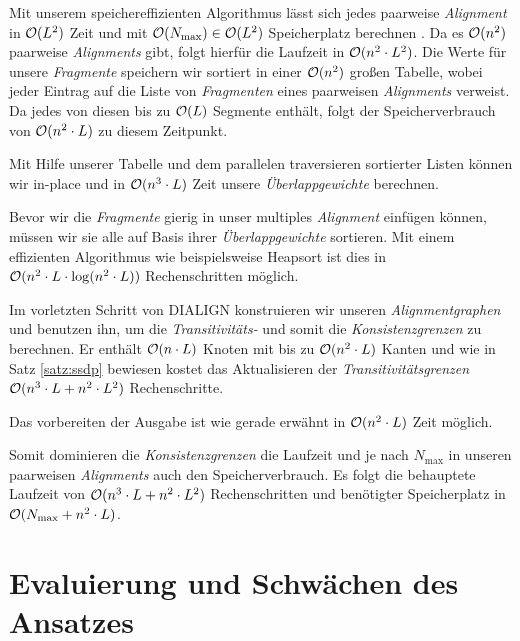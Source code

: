 \begin{beweis}
	Mit unserem speichereffizienten Algorithmus lässt sich jedes paarweise \emph{Alignment} in $\mathcal{O}(L^2)$ Zeit und mit $\mathcal{O}(N_{\max}) \in \mathcal{O}(L^2)$ Speicherplatz berechnen \citep{m02}. Da es $\mathcal{O}(n^2)$ paarweise \emph{Alignments} gibt, folgt hierfür die Laufzeit in $\mathcal{O}(n^2\cdot L^2)$. Die Werte für unsere \emph{Fragmente} speichern wir sortiert in einer $\mathcal{O}(n^2)$ großen Tabelle, wobei jeder Eintrag auf die Liste von \emph{Fragmenten} eines paarweisen \emph{Alignments} verweist. Da jedes von diesen bis zu $\mathcal{O}(L)$ Segmente enthält, folgt der Speicherverbrauch von $\mathcal{O}(n^2\cdot L)$ zu diesem Zeitpunkt.
	
	Mit Hilfe unserer Tabelle und dem parallelen traversieren sortierter Listen können wir in-place und in $\mathcal{O}(n^3\cdot L)$ Zeit unsere \emph{Überlappgewichte} berechnen.
	
	Bevor wir die \emph{Fragmente} gierig in unser multiples \emph{Alignment} einfügen können, müssen wir sie alle auf Basis ihrer \emph{Überlappgewichte} sortieren. Mit einem effizienten Algorithmus wie beispielsweise Heapsort ist dies in $\mathcal{O}(n^2\cdot L\cdot \log(n^2\cdot L))$ Rechenschritten möglich. 
	
	Im vorletzten Schritt von DIALIGN konstruieren wir unseren \emph{Alignmentgraphen} und benutzen ihn, um die \emph{Transitivitäts-} und somit die \emph{Konsistenzgrenzen} zu berechnen. Er enthält $\mathcal{O}(n\cdot L)$ Knoten mit bis zu $\mathcal{O}(n^2\cdot L)$ Kanten und wie in Satz \ref{satz:ssdp} bewiesen kostet das Aktualisieren der \emph{Transitivitätsgrenzen} $\mathcal{O}(n^3\cdot L + n^2\cdot L^2)$ Rechenschritte. 
	
	Das vorbereiten der Ausgabe ist wie gerade erwähnt in $\mathcal{O}(n^2\cdot L)$ Zeit möglich.
	
	Somit dominieren die \emph{Konsistenzgrenzen} die Laufzeit und je nach $N_{\max}$ in unseren paarweisen \emph{Alignments} auch den Speicherverbrauch. Es folgt die behauptete Laufzeit von $\mathcal{O}(n^3\cdot L + n^2\cdot L^2)$ Rechenschritten und benötigter Speicherplatz in $\mathcal{O}(N_{\max} + n^2\cdot L)$. 
\end{beweis}

\section{Evaluierung und Schwächen des Ansatzes}
